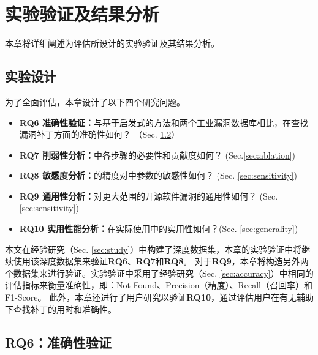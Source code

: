 \chapter{实验验证及结果分析}

本章将详细阐述为评估\tool 所设计的实验验证及其结果分析。


\section{实验设计}
为了全面评估\tool ，本章设计了以下四个研究问题。

\begin{itemize}[leftmargin=*]
\item \textbf{RQ6 准确性验证：}与基于启发式的方法和两个工业漏洞数据库相比，\tool 在查找漏洞补丁方面的准确性如何？ （Sec. \ref{sec:accuracy-evaluation}）
\item \textbf{RQ7 削弱性分析：}\tool 中各步骤的必要性和贡献度如何？ (Sec.\ref{sec:ablation})%
\item \textbf{RQ8 敏感度分析：}\tool 的精度对\tool 中参数的敏感性如何？ (Sec. \ref{sec:sensitivity})
\item \textbf{RQ9 通用性分析：}\tool 对更大范围的开源软件漏洞的通用性如何？ (Sec. \ref{sec:sensitivity})
\item \textbf{RQ10 实用性能分析：}\tool 在实际使用中的实用性如何？(Sec. \ref{sec:generality})
\end{itemize}


本文在经验研究（Sec. \ref{sec:study}）中构建了深度数据集，本章的实验验证中将继续使用该深度数据集来验证\textbf{RQ6}、\textbf{RQ7}和\textbf{RQ8}。 对于\textbf{RQ9}，本章将构造另外两个数据集来进行验证。实验验证中采用了经验研究（Sec. \ref{sec:accuracy}）中相同的评估指标来衡量准确性，即：Not Found、Precision（精度）、Recall（召回率）和 F1-Score。
此外，本章还进行了用户研究以验证\textbf{RQ10}，通过评估用户在有无\tool 辅助下查找补丁的用时和准确性。


\section{RQ6：准确性验证}\label{sec:accuracy-evaluation}

